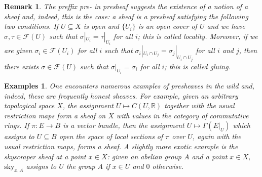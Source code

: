 \documentclass{amsart}          %
\newtheorem{remark}[theorem]{Remark}
\newtheorem*{examples*}{Examples}
\newcommand{\R}{\mathbb R}
\begin{document}
\begin{remark}
	The preffix \textup{pre-} in \textup{presheaf} suggests the existence of a notion of a \textup{sheaf} and, indeed, this is the case: a sheaf is a presheaf satisfying the following two conditions. If $U\subseteq X$ is open and $\{U_i\}$ is an open cover of $U$ and we have $\sigma,\tau\in\mathscr{F}(U)$ such that $\sigma|_{U_i}=\tau|_{U_i}$ for all $i$; this is called \textup{locality}. Moreover, if we are given $\sigma_i\in\mathscr{F}(U_i)$ for all $i$ such that $\sigma_i|_{U_i\cap U_j}=\sigma_j|_{U_i\cap U_j}$ for all $i$ and $j$, then there exists $\sigma\in\mathscr{F}(U)$ such that $\sigma|_{U_i}=\sigma_i$ for all $i$; this is called \textup{gluing}.
\end{remark}
\begin{examples*}
	One encounters numerous examples of presheaves in the wild and, indeed, these are frequently honest sheaves. For example, given an arbitrary topological space $X$, the assignment $U\mapsto C(U,\R)$ together with the usual restriction maps form a sheaf on $X$ with values in the category of commutative rings. If $\pi:E\to B$ is a vector bundle, then the assignment $U\mapsto\Gamma\left(E|_{U}\right)$ which assigns to $U\subseteq B$ open the space of local sections of $\pi$ over $U$, again with the usual restriction maps, forms a sheaf. A slightly more exotic example is the \textup{skyscraper sheaf} at a point $x\in X$: given an abelian group $A$ and a point $x\in X$, $\mathrm{sky}_{x,A}$ assigns to $U$ the group $A$ if $x\in U$ and $0$ otherwise.
\end{examples*}
\end{document}
